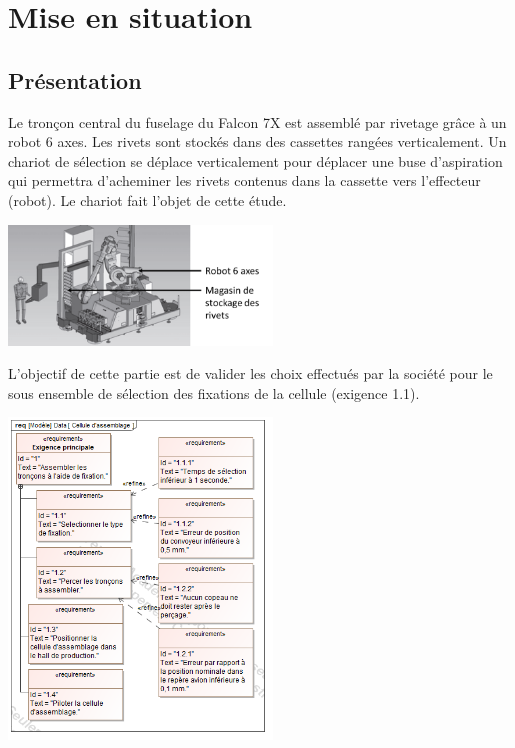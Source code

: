 \documentclass[10pt,fleqn]{article} %
\begin{document}

\vspace{7cm}
\pagestyle{fancy}
\thispagestyle{plain}

\section*{Mise en situation}
\subsection*{Présentation}
Le tronçon central du fuselage du Falcon 7X est assemblé par rivetage grâce à un robot 6 axes. Les rivets sont stockés dans des cassettes rangées verticalement. Un chariot de sélection se déplace verticalement pour déplacer une buse d’aspiration qui permettra d’acheminer les rivets contenus dans la cassette vers l’effecteur (robot). Le chariot fait l’objet de cette étude.

\begin{center}
\includegraphics[width=7cm]{images/image5}
\end{center} 

 
L'objectif de cette partie est de valider les choix effectués par la société pour le sous ensemble de sélection des fixations de la cellule (exigence 1.1).


\begin{center}
\includegraphics[width=7cm]{images/image6}
\end{center} 
\end{document}
